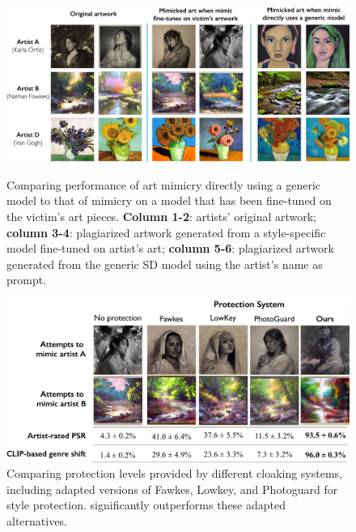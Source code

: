 \begin{figure}[t]
\end{figure}


\begin{figure}[t]
  \begin{minipage}{0.44\textwidth}
  \centering
  \includegraphics[width=1\columnwidth]{plots/appendix/generic-vs-finetuning.pdf}
  \vspace{-0.23in}
  \caption{Comparing performance of art mimicry directly using a generic
    model to that of mimicry on a model that has been fine-tuned on the
    victim's art pieces. \textbf{Column 1-2}: artists' original
    artwork; \textbf{column 3-4}: plagiarized artwork generated from a
    style-specific model fine-tuned on artist's art; \textbf{column
      5-6}: plagiarized artwork generated from the generic SD model using the
    artist's name as prompt.}
  \label{fig:generic-vs-finetune}
  \end{minipage}
  \hfill
\centering
  \begin{minipage}{0.48\textwidth}
  \centering
  \includegraphics[width=1\columnwidth]{plots/eval/comparsion.pdf}
  \vspace{-0.23in}
  \caption{Comparing protection levels provided by different cloaking
    systems, including adapted versions of Fawkes, Lowkey, and Photoguard for style
    protection. \system{} significantly outperforms these adapted alternatives.} 
  \label{fig:existing-sys}
  \end{minipage}
  \hfill
\end{figure}

